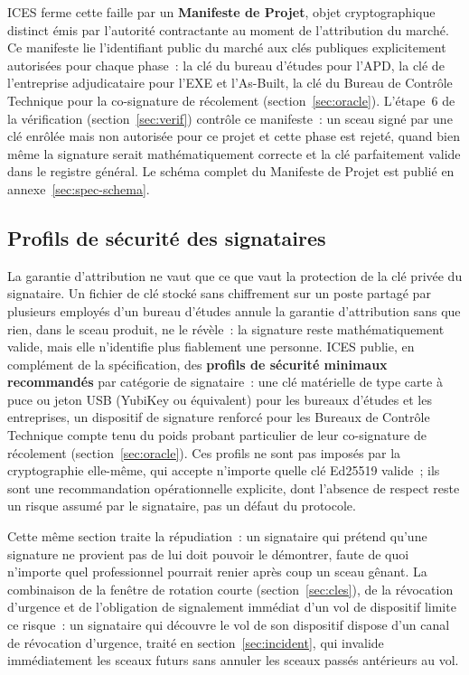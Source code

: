 \documentclass[11pt,a4paper]{article}
\begin{document}
ICES ferme cette faille par un \textbf{Manifeste de Projet}, objet cryptographique distinct émis par l'autorité contractante au moment de l'attribution du marché. Ce manifeste lie l'identifiant public du marché aux clés publiques explicitement autorisées pour chaque phase~: la clé du bureau d'études pour l'APD, la clé de l'entreprise adjudicataire pour l'EXE et l'As-Built, la clé du Bureau de Contrôle Technique pour la co-signature de récolement (section~\ref{sec:oracle}). L'étape~6 de la vérification (section~\ref{sec:verif}) contrôle ce manifeste~: un sceau signé par une clé enrôlée mais non autorisée pour ce projet et cette phase est rejeté, quand bien même la signature serait mathématiquement correcte et la clé parfaitement valide dans le registre général. Le schéma complet du Manifeste de Projet est publié en annexe~\ref{sec:spec-schema}.

\subsection{Profils de sécurité des signataires}\label{sec:profils}

La garantie d'attribution ne vaut que ce que vaut la protection de la clé privée du signataire. Un fichier de clé stocké sans chiffrement sur un poste partagé par plusieurs employés d'un bureau d'études annule la garantie d'attribution sans que rien, dans le sceau produit, ne le révèle~: la signature reste mathématiquement valide, mais elle n'identifie plus fiablement une personne. ICES publie, en complément de la spécification, des \textbf{profils de sécurité minimaux recommandés} par catégorie de signataire~: une clé matérielle de type carte à puce ou jeton USB (YubiKey ou équivalent) pour les bureaux d'études et les entreprises, un dispositif de signature renforcé pour les Bureaux de Contrôle Technique compte tenu du poids probant particulier de leur co-signature de récolement (section~\ref{sec:oracle}). Ces profils ne sont pas imposés par la cryptographie elle-même, qui accepte n'importe quelle clé Ed25519 valide~; ils sont une recommandation opérationnelle explicite, dont l'absence de respect reste un risque assumé par le signataire, pas un défaut du protocole.

Cette même section traite la répudiation~: un signataire qui prétend qu'une signature ne provient pas de lui doit pouvoir le démontrer, faute de quoi n'importe quel professionnel pourrait renier après coup un sceau gênant. La combinaison de la fenêtre de rotation courte (section~\ref{sec:cles}), de la révocation d'urgence et de l'obligation de signalement immédiat d'un vol de dispositif limite ce risque~: un signataire qui découvre le vol de son dispositif dispose d'un canal de révocation d'urgence, traité en section~\ref{sec:incident}, qui invalide immédiatement les sceaux futurs sans annuler les sceaux passés antérieurs au vol.
\end{document}
